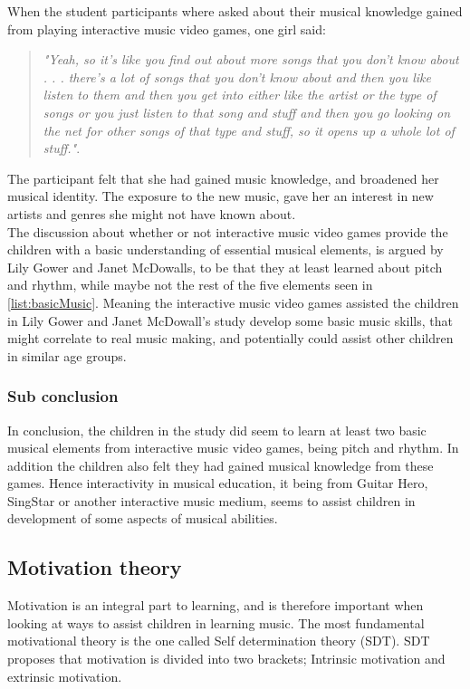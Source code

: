 When the student participants where asked about their musical knowledge gained from playing interactive music video games, one girl said:
\begin{quote}
	\textit{"Yeah, so it’s like you find out about more songs that you don’t know about . . . there’s a lot of songs that you don’t know about and then you like listen to them and then you get into either like the artist or the type of songs or you just listen to that song and stuff and then you go looking on the net for other songs of that type and stuff, so it opens up a whole lot of stuff."}\cite[p.~100]{interactiveMusicVideoGames}.\\
\end{quote}	
The participant felt that she had gained music knowledge, and broadened her musical identity. The exposure to the new music, gave her an interest in new artists and genres she might not have known about.\\

The discussion about whether or not interactive music video games provide the children with a basic understanding of essential musical elements, is argued by Lily Gower and Janet McDowalls, to be that they at least learned about pitch and rhythm, while maybe not the rest of the five elements seen in \autoref{list:basicMusic}. Meaning the interactive music video games assisted the children in Lily Gower and Janet McDowall's study develop some basic music skills, that might correlate to real music making\cite[p.~99]{interactiveMusicVideoGames}, and potentially could assist other children in similar age groups.

\subsubsection*{Sub conclusion}
In conclusion, the children in the study\cite{interactiveMusicVideoGames} did seem to learn at least two basic musical elements from interactive music video games, being pitch and rhythm. In addition the children also felt they had gained musical knowledge from these games. Hence interactivity in musical education, it being from Guitar Hero, SingStar or another interactive music medium, seems to assist children in development of some aspects of musical abilities.

\subsection{Motivation theory}
Motivation is an integral part to learning\cite{motivationGameDesign}, and is therefore important when looking at ways to assist children in learning music. The most fundamental motivational theory is the one called Self determination theory (SDT)\cite{SDT}. SDT proposes that motivation is divided into two brackets; Intrinsic motivation and extrinsic motivation\cite{SDT}. 

